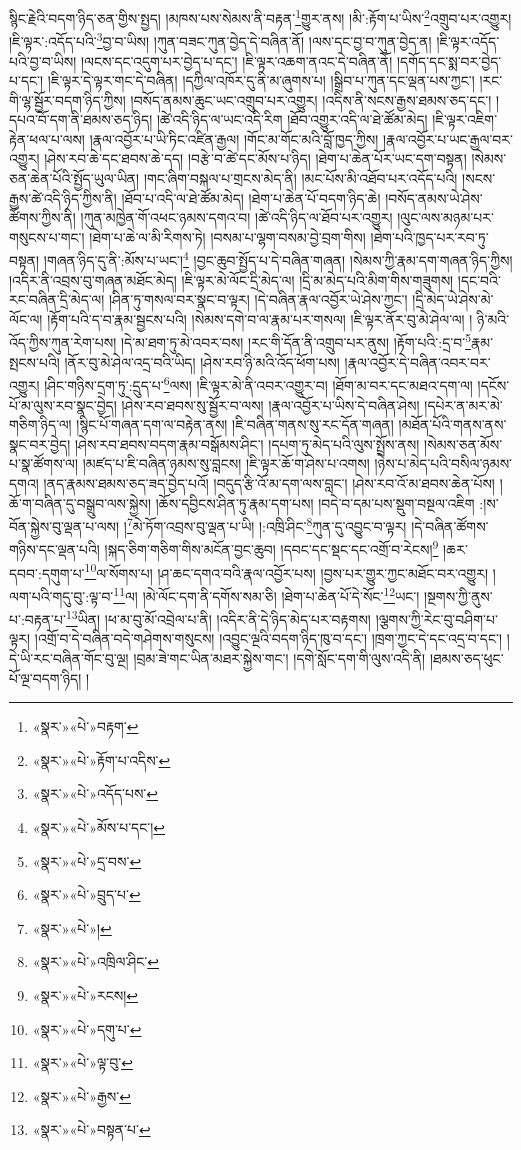 སྙིང་རྗེའི་བདག་ཉིད་ཅན་གྱིས་སྤྱད། །མཁས་པས་སེམས་ནི་བརྟན་\footnote{«སྣར་»«པེ་»བརྟག་}གྱུར་ནས། །མི་:རྟོག་པ་ཡིས་\footnote{«སྣར་»«པེ་»རྟོག་པ་འདིས་}འགྲུབ་པར་འགྱུར། །ཇི་ལྟར་:འདོད་པའི་\footnote{«སྣར་»«པེ་»འདོད་པས་}བྱ་བ་ཡིས། །ཀུན་བཟང་ཀུན་བྱེད་དེ་བཞིན་ནོ། །ལས་དང་བྱ་བ་ཀུན་བྱེད་ན། །ཇི་ལྟར་འདོད་པའི་བྱ་བ་ཡིས། །ལངས་དང་འདུག་པར་བྱེད་པ་དང་། །ཇི་ལྟར་འཆག་ནའང་དེ་བཞིན་ནོ། །དགོད་དང་སྨ་བར་བྱེད་པ་དང་། །ཇི་ལྟར་དེ་ལྟར་གང་དེ་བཞིན། །དཀྱིལ་འཁོར་དུ་ནི་མ་ཞུགས་པ། །སྒྲིབ་པ་ཀུན་དང་ལྡན་པས་ཀྱང་། །རང་གི་ལྷ་སྦྱོར་བདག་ཉིད་ཀྱིས། །བསོད་ནམས་ཆུང་ཡང་འགྲུབ་པར་འགྱུར། །འདིས་ནི་སངས་རྒྱས་ཐམས་ཅད་དང་། །དཔའ་བོ་དག་ནི་ཐམས་ཅད་ཉིད། །ཚེ་འདི་ཉིད་ལ་ཡང་འདི་རིག །ཐོབ་འགྱུར་འདི་ལ་ཐེ་ཚོམ་མེད། །ཇི་ལྟར་འཇིག་རྟེན་ཕལ་པ་ལས། །རྣལ་འབྱོར་པ་ཡི་ཏིང་འཛིན་རྒྱལ། །གོང་མ་གོང་མའི་བློ་ཁྱད་ཀྱིས། །རྣལ་འབྱོར་པ་ཡང་རྒྱལ་བར་འགྱུར། །ཤེས་རབ་ཆེ་དང་ཐབས་ཆེ་དད། །བརྩེ་བ་ཚེ་དང་མོས་པ་ཉིད། །ཐེག་པ་ཆེན་པོར་ཡང་དག་བསྟན། །སེམས་ཅན་ཆེན་པོའི་སྤྱོད་ཡུལ་ཡིན། །གང་ཞིག་བསྐལ་པ་གྲངས་མེད་ནི། །མང་པོས་མི་འཐོབ་པར་འདོད་པའི། །སངས་རྒྱས་ཚེ་འདི་ཉིད་ཀྱིས་ནི། །ཐོབ་པ་འདི་ལ་ཐེ་ཚོམ་མེད། །ཐེག་པ་ཆེན་པོ་བདག་ཉིད་ཆེ། །བསོད་ནམས་ཡེ་ཤེས་ཚོགས་ཀྱིས་ནི། །ཀུན་མཁྱེན་གོ་འཕང་ཉམས་དགའ་བ། །ཚེ་འདི་ཉིད་ལ་ཐོབ་པར་འགྱུར། །ལུང་ལས་མཉམ་པར་གསུངས་པ་གང་། །ཐེག་པ་ཆེ་ལ་མི་རིགས་ཏེ། །བསམ་པ་ལྷག་བསམ་བྱེ་བྲག་གིས། །ཐེག་པའི་ཁྱད་པར་རབ་ཏུ་བསྟན། །གཞན་ཉིད་དུ་ནི་:མོས་པ་ཡང་།\footnote{«སྣར་»«པེ་»མོས་པ་དང་།} །བྱང་ཆུབ་སྤྱོད་པ་དེ་བཞིན་གཞན། །སེམས་ཀྱི་རྣམ་དག་གཞན་ཉིད་ཀྱིས། །འདིར་ནི་འབྲས་བུ་གཞན་མཐོང་མེད། །ཇི་ལྟར་མེ་ལོང་དྲི་མེད་ལ། །དྲི་མ་མེད་པའི་མིག་གིས་གཟུགས། །དང་བའི་རང་བཞིན་དྲི་མེད་ལ། །ཤིན་ཏུ་གསལ་བར་སྣང་བ་ལྟར། །དེ་བཞིན་རྣལ་འབྱོར་ཡེ་ཤེས་ཀྱང་། །དྲི་མེད་ཡེ་ཤེས་མེ་ལོང་ལ། །རྟོག་པའི་ད་བ་རྣམ་སྦྱངས་པའི། །སེམས་དགེ་བ་ལ་རྣམ་པར་གསལ། །ཇི་ལྟར་ནོར་བུ་མེ་ཤེལ་ལ། །
ཉི་མའི་འོད་ཀྱིས་ཀུན་རེག་པས། །དེ་མ་ཐག་ཏུ་མེ་འབར་བས། །རང་གི་དོན་ནི་འགྲུབ་པར་ནུས། །རྟོག་པའི་:དྲ་བ་\footnote{«སྣར་»«པེ་»དྲ་བས་}རྣམ་སྤངས་པའི། །ནོར་བུ་མེ་ཤེལ་འདྲ་བའི་ཡིད། །ཤེས་རབ་ཉི་མའི་འོད་ཕོག་པས། །རྣལ་འབྱོར་དེ་བཞིན་འབར་བར་འགྱུར། །ཤིང་གཉིས་དྲག་ཏུ་:དྲུད་པ་\footnote{«སྣར་»«པེ་»བྲུད་པ་}ལས། །ཇི་ལྟར་མེ་ནི་འབར་འགྱུར་བ། །ཐོག་མ་བར་དང་མཐའ་དག་ལ། །དངོས་པོ་མ་ལུས་རབ་སྣང་བྱེད། །ཤེས་རབ་ཐབས་སུ་སྦྱོར་བ་ལས། །རྣལ་འབྱོར་པ་ཡིས་དེ་བཞིན་ཤེས། །དཔེར་ན་མར་མེ་གཅིག་ཉིད་ལ། །སྙིང་པོ་གཞན་དག་ལ་བརྟེན་ནས། །ཇི་བཞིན་གནས་སུ་རང་དོན་གཞན། །མཐོན་པོའི་གནས་ནས་སྣང་བར་བྱེད། །ཤེས་རབ་ཐབས་བདག་རྣམ་བསྒོམས་ཤིང་། །དཔག་ཏུ་མེད་པའི་ལུས་སྤྲོས་ནས། །སེམས་ཅན་མོས་པ་སྣ་ཚོགས་ལ། །མཛད་པ་ཇི་བཞིན་ཉམས་སུ་བླངས། །ཇི་ལྟར་ཆོ་ག་ཤེས་པ་འགས། །ཉེས་པ་མེད་པའི་བསིལ་ཉམས་དགའ། །ནད་རྣམས་ཐམས་ཅད་ཟད་བྱེད་པའོ། །བདུད་རྩི་འོ་མ་དག་ལས་བླང་། །ཤེས་རབ་འོ་མ་ཐབས་ཆེན་པོས། །ཆོ་ག་བཞིན་དུ་བསྒྲུབ་ལས་སྐྱེས། །ཆོས་དབྱིངས་ཤིན་ཏུ་རྣམ་དག་པས། །བདེ་བ་དམ་པས་སྡུག་བསྔལ་འཇིག :།ས་བོན་སྐྱེས་བུ་ལྡན་པ་ལས། །\footnote{«སྣར་»«པེ་»།}མེ་ཏོག་འབྲས་བུ་ལྡན་པ་ཡི། །:འཁྲི་ཤིང་\footnote{«སྣར་»«པེ་»འཁྲིལ་ཤིང་}ཀུན་དུ་འབྱུང་བ་ལྟར། །དེ་བཞིན་ཚོགས་གཉིས་དང་ལྡན་པའི། །སྐད་ཅིག་གཅིག་གིས་མངོན་བྱང་ཆུབ། །དབང་དང་སྡང་དང་འགྲོ་བ་རེངས།\footnote{«སྣར་»«པེ་»རངས།} །ཆར་དབབ་:དགུག་པ་\footnote{«སྣར་»«པེ་»དགུ་པ་}ལ་སོགས་པ། །ཤ་ཆང་དགའ་བའི་རྣལ་འབྱོར་པས། །བྱས་པར་གྱུར་ཀྱང་མཐོང་བར་འགྱུར། །ལག་པའི་གདུ་བུ་:ལྟ་བ་\footnote{«སྣར་»«པེ་»ལྟ་བུ་}ལ། །མེ་ལོང་དག་ནི་དགོས་སམ་ཅི། །ཐེག་པ་ཆེན་པོ་དེ་སོང་\footnote{«སྣར་»«པེ་»རྒྱས་}ཡང་། །སྔགས་ཀྱི་ནུས་པ་:བརྟན་པ་\footnote{«སྣར་»«པེ་»བསྟན་པ་}ཡིན། །ཕ་མ་བུ་མོ་འབྲེལ་པ་ནི། །འདིར་ནི་དེ་ཉིད་མེད་པར་བརྟགས། །ལྕགས་ཀྱི་རེང་བུ་བཤིག་པ་ལྟར། །འགྲོ་བ་དེ་བཞིན་བདེ་གཤེགས་གསུངས། །འབྱུང་ལྔའི་བདག་ཉིད་ཁུ་བ་དང་། །ཁྲག་ཀྱང་དེ་དང་འདྲ་བ་དང་། །དེ་ཡི་རང་བཞིན་གོང་བུ་ལྔ། །བྲམ་ཟེ་གང་ཡིན་མཐར་སྐྱེས་གང་། །དགེ་སློང་དག་གི་ལུས་འདི་ནི། །ཐམས་ཅད་ཕུང་པོ་ལྔ་བདག་ཉིད། །

